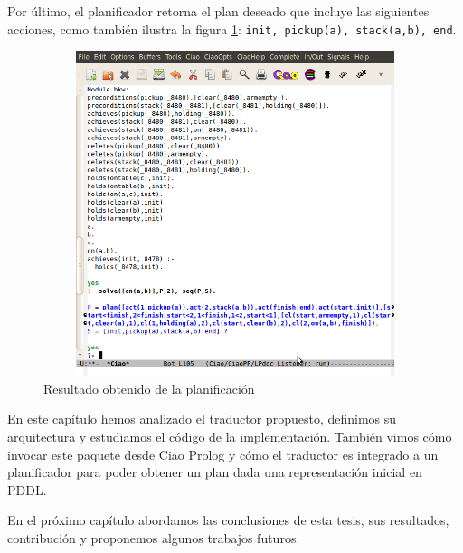    Por \'ultimo, el planificador retorna el plan deseado que incluye las
   siguientes acciones, como tambi\'en ilustra la figura \ref{demo:plan}:
   \texttt{init, pickup(a), stack(a,b), end}.

  \begin{figure}[h!]
  \centering
  \includegraphics[width=12cm,height=9.5cm]{demoPopPlan.png} 
       \caption{Resultado obtenido de la planificaci\'on}
	\label{demo:plan}
   \end{figure}


   En este cap\'itulo hemos analizado el traductor
   propuesto, definimos su arquitectura y estudiamos el c\'odigo de la
   implementaci\'on. Tambi\'en vimos c\'omo invocar este paquete desde
   Ciao Prolog y c\'omo el traductor es integrado a un planificador
   para poder obtener un plan dada una representaci\'on inicial en
   PDDL.

   En el pr\'oximo cap\'itulo abordamos las conclusiones de esta
   tesis, sus resultados, contribuci\'on y proponemos algunos
   trabajos futuros.

